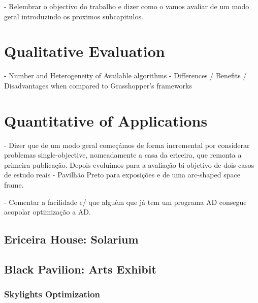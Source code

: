 \cleardoublepage
\label{chap:implement}

 - Relembrar o objectivo do trabalho e dizer como o vamos avaliar de um modo geral introduzindo os proximos subcapitulos.
 
\section{Qualitative Evaluation}
- Number and Heterogeneity of Available algorithms
- Differences / Benefits / Disadvantages when compared to Grasshopper's frameworks

\section{Quantitative of Applications}

- Dizer que de um modo geral começámos de forma incremental por considerar problemas single-objective, nomeadamente a casa da ericeira, que remonta a primeira publicação. Depois evoluimos para a avaliação bi-objetivo de dois casos de estudo reais - Pavilhão Preto para exposições e de uma arc-shaped space frame.

- Comentar a facilidade c/ que alguém que já tem um programa AD consegue acopolar optimização a AD.

\subsection{Ericeira House: Solarium}

\subsection{Black Pavilion: Arts Exhibit}

\subsubsection{Skylights Optimization}

